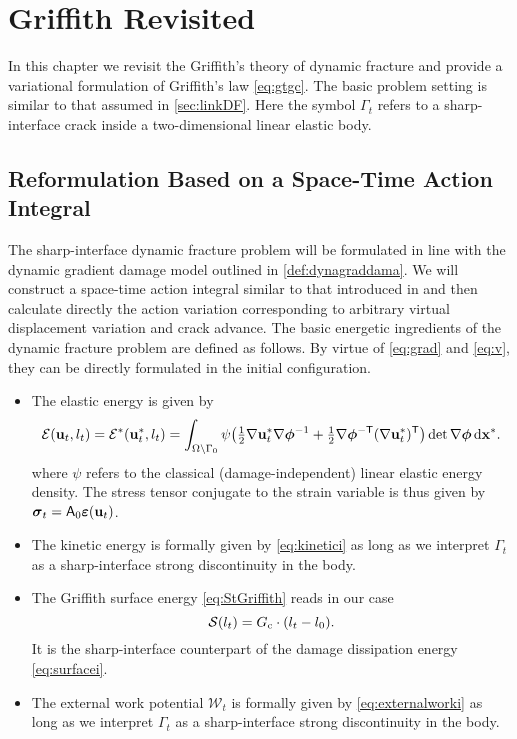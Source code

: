 \appendix
\chapter{Griffith Revisited} \label{chap:griffithrevis}

In this chapter we revisit the Griffith's theory of dynamic fracture and provide a variational formulation of Griffith's law \eqref{eq:gtgc}. The basic problem setting is similar to that assumed in \cref{sec:linkDF}. Here the symbol $\Gamma_t$ refers to a sharp-interface crack inside a two-dimensional linear elastic body.

\section*{Reformulation Based on a Space-Time Action Integral}
The sharp-interface dynamic fracture problem will be formulated in line with the dynamic gradient damage model outlined in \cref{def:dynagraddama}. We will construct a space-time action integral similar to that introduced in \cite{Adda-BediaAriasAmarLund:1999} and then calculate directly the action variation corresponding to arbitrary virtual displacement variation and crack advance. The basic energetic ingredients of the dynamic fracture problem are defined as follows. By virtue of \eqref{eq:grad} and \eqref{eq:v}, they can be directly formulated in the initial configuration.
\begin{itemize}
\item The elastic energy is given by
\begin{equation} \label{eq:elastici}
\mathcal{E}(\vec{u}_t,l_t)=\mathcal{E}^*(\vec{u}_t^*,l_t)=\int_\domaini\psi\bigl({\textstyle\frac{1}{2}}\nabla\vec{u}_t^*\nabla\philt^{-1}+{\textstyle\frac{1}{2}}\nabla\philt^{-\mathsf{T}}(\nabla\vec{u}_t^*)^\mT\bigr)\det\nabla\philt\dxx.
\end{equation}
where $\psi$ refers to the classical (damage-independent) linear elastic energy density. The stress tensor conjugate to the strain variable is thus given by $\sig_t=\tens{A}_0\eps(\vec{u}_t)$.

\item The kinetic energy is formally given by \eqref{eq:kinetici} as long as we interpret $\Gamma_t$ as a sharp-interface strong discontinuity in the body.

\item The Griffith surface energy \eqref{eq:StGriffith} reads in our case
\begin{equation} \label{eq:griffith}
\mathcal{S}(l_t)=G_\mathrm{c}\cdot(l_t-l_0).
\end{equation}
It is the sharp-interface counterpart of the damage dissipation energy \eqref{eq:surfacei}.

\item The external work potential $\mathcal{W}_t$ is formally given by \eqref{eq:externalworki} as long as we interpret $\Gamma_t$ as a sharp-interface strong discontinuity in the body.
\end{itemize}

